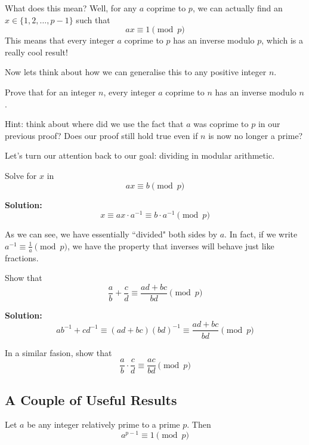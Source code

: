 \documentclass{article}
\theoremstyle{mytheoremstyle}
\theoremstyle{mytheoremstyle}
\theoremstyle{myproblemstyle}
\theoremstyle{myproblemstyle}
\theoremstyle{myproblemstyle}
\begin{document}
    \vspace{5pt}
    What does this mean? Well, for any $a$ coprime to $p$, we can actually find an $x \in \{1, 2, \ldots, p-1\}$ such that $$ax \equiv 1 \pmod{p}$$ This means that every integer $a$ coprime to $p$ has an inverse modulo $p$, which is a really cool result!
    \vspace{5pt}

    Now lets think about how we can generalise this to any positive integer $n$. 
    \begin{exercise}
        Prove that for an integer $n$, every integer $a$ coprime to $n$ has an inverse modulo $n$.
    \end{exercise}
    Hint: think about where did we use the fact that $a$ was coprime to $p$ in our previous proof? Does our proof still hold true even if $n$ is now no longer a prime?
    
    \vspace{5pt}
    Let's turn our attention back to our goal: dividing in modular arithmetic.
    \begin{example}
        Solve for $x$ in $$ax \equiv b \pmod{p}$$ 
    \end{example}
    \textbf{Solution:} $$x \equiv ax \cdot a^{-1} \equiv b \cdot a^{-1} \pmod{p}$$

    As we can see, we have essentially ``divided" both sides by $a$. In fact, if we write $a^{-1} \equiv \frac{1}{a} \pmod{p}$, we have the property that inverses will behave just like fractions.
    \begin{example}
        Show that $$\frac{a}{b} + \frac{c}{d}\equiv \frac{ad + bc}{bd} \pmod{p}$$  
    \end{example}
    \textbf{Solution:} $$ab^{-1} + cd^{-1} \equiv (ad + bc)(bd)^{-1} \equiv \frac{ad + bc}{bd} \pmod{p}$$
    \begin{exercise}
        In a similar fasion, show that $$\frac{a}{b} \cdot \frac{c}{d}\equiv \frac{ac}{bd} \pmod{p}$$  
    \end{exercise}

    \subsection{A Couple of Useful Results}
    \begin{theorem}
        Let $a$ be any integer relatively prime to a prime $p$. Then $$a^{p-1} \equiv 1 \pmod{p}$$
    \end{theorem}
\end{document}
